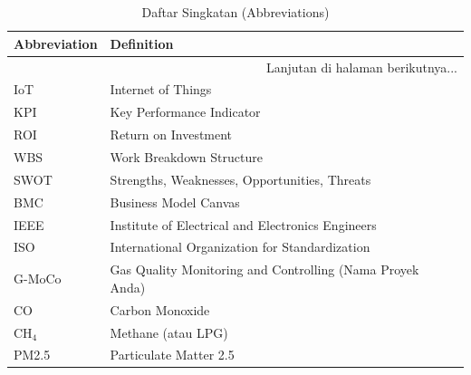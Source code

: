 \documentclass{elsinta}
\begin{document}
\section{\AbbrevTitle}

\begin{longtable}{|p{4cm}|p{11cm}|} %
    \caption{Daftar Singkatan (Abbreviations)} \label{tab:abbreviations2} \\
    \hline
    \textbf{Abbreviation} & \textbf{Definition} \\
    \hline
    \endhead %
    
    \hline 
    \multicolumn{2}{|r|}{Lanjutan di halaman berikutnya...} \\ 
    \endfoot %
    
    \hline
    \endlastfoot %

    IoT & Internet of Things \\
    \hline
    KPI & Key Performance Indicator \\
    \hline
    ROI & Return on Investment \\
    \hline
    WBS & Work Breakdown Structure \\
    \hline
    SWOT & Strengths, Weaknesses, Opportunities, Threats \\
    \hline
    BMC & Business Model Canvas \\
    \hline
    IEEE & Institute of Electrical and Electronics Engineers \\
    \hline
    ISO & International Organization for Standardization \\
    \hline
    G-MoCo & Gas Quality Monitoring and Controlling (Nama Proyek Anda) \\
    \hline
    CO & Carbon Monoxide \\
    \hline
    CH$_4$ & Methane (atau LPG) \\
    \hline
    PM2.5 & Particulate Matter 2.5 \\
    \hline
    

\end{longtable}

\end{document}
